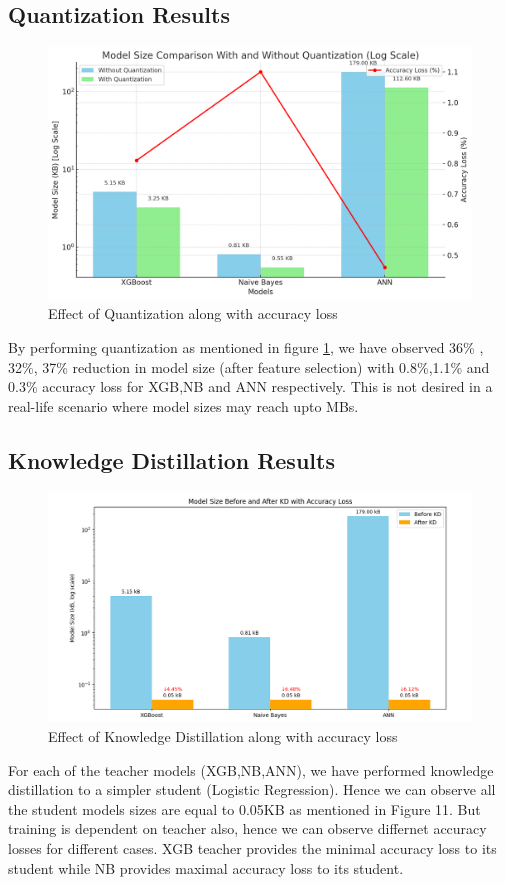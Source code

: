 \documentclass[conference,letterpaper]{IEEEtran}
\begin{document}
\subsection{Quantization Results}
\begin{figure}[h]
    \centering
    \includegraphics[width=\linewidth]{1e2800d7-96cd-42c0-9a1b-3bbc28a2501c.png}
    \caption{Effect of Quantization along with accuracy loss}
    \label{fig:quant}
\end{figure}
By performing quantization as mentioned in figure \ref{fig:quant}, we have observed 36\% , 32\%, 37\% reduction in model size (after feature selection) with 0.8\%,1.1\% and 0.3\% accuracy loss for XGB,NB and ANN respectively. This is not desired in a real-life scenario where model sizes may reach upto MBs. 

\subsection{Knowledge Distillation Results}
\begin{figure}[h]
    \centering
    \includegraphics[width=\linewidth]{knowledge_distillation.png}
    \caption{Effect of Knowledge Distillation along with accuracy loss}
    \label{fig:fs_size}
\end{figure}
For each of the teacher models (XGB,NB,ANN), we have performed knowledge distillation to a simpler student (Logistic Regression). Hence we can observe all the student models sizes are equal to 0.05KB as mentioned in Figure 11. But training is dependent on teacher also, hence we can observe differnet accuracy losses for different cases. XGB teacher provides the minimal accuracy loss to its student while NB provides maximal accuracy loss to its student.
\end{document}
